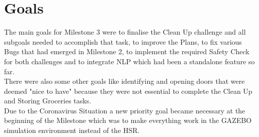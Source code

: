 \documentclass[main.tex]{subfiles}
\begin{document}
	
	\chapter{Goals}
The main goals for Milestone 3 were to finalise the Clean Up challenge and all subgoals needed to accomplish that task, to improve the Plans, to fix various Bugs that had emerged in Milestone 2, to implement the required Safety Check for both challenges and to integrate NLP which had been a standalone feature so far.\\
There were also some other goals like identifying and opening doors that were deemed "nice to have" because they were not essential to complete the Clean Up and Storing Groceries tasks.\\
Due to the Coronavirus Situation a new priority goal became necessary at the beginning of the Milestone which was to make everything work in the GAZEBO simulation environment instead of the HSR.
	
\end{document}
